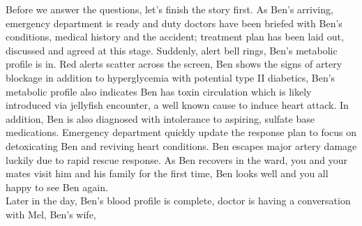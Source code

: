Before we answer the questions, let's finish the story first. As Ben's arriving, emergency department is ready and duty doctors have been briefed with Ben's conditions, medical history and the accident; treatment plan has been laid out, discussed and agreed at this stage. Suddenly, alert bell rings, Ben's metabolic profile is in. Red alerts scatter across the screen, Ben shows the signs of artery blockage in addition to hyperglycemia with potential type II diabetics, Ben's metabolic profile also indicates Ben has toxin circulation which is likely introduced via jellyfish encounter, a well known cause to induce heart attack. In addition, Ben is also diagnosed with intolerance to aspiring, sulfate base medications. Emergency department quickly update the response plan to focus on  detoxicating Ben and reviving heart conditions. Ben escapes major artery damage luckily due to rapid rescue response. As Ben recovers in the ward, you and your mates visit him and his family for the first time, Ben looks well and you all happy to see Ben again.\\
Later in the day, Ben's blood profile is complete, doctor is having a conversation with Mel, Ben's wife, \\

